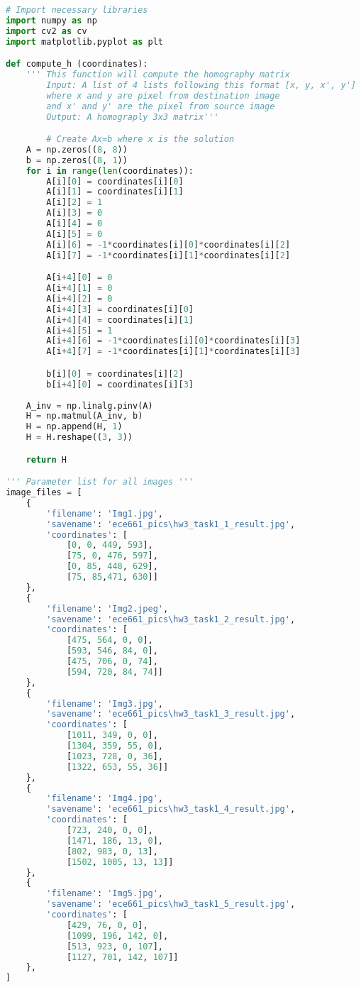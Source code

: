 \documentclass[11pt]{article}
\begin{document}
\begin{lstlisting}[language=Python, showstringspaces=false]
# Import necessary libraries
import numpy as np
import cv2 as cv
import matplotlib.pyplot as plt  

def compute_h (coordinates):
    ''' This function will compute the homography matrix
        Input: A list of 4 lists following this format [x, y, x', y']
        where x and y are pixel from destination image
        and x' and y' are the pixel from source image
        Output: A homograply 3x3 matrix'''

        # Create Ax=b where x is the solution
    A = np.zeros((8, 8))
    b = np.zeros((8, 1))
    for i in range(len(coordinates)):
        A[i][0] = coordinates[i][0]
        A[i][1] = coordinates[i][1]
        A[i][2] = 1
        A[i][3] = 0
        A[i][4] = 0
        A[i][5] = 0
        A[i][6] = -1*coordinates[i][0]*coordinates[i][2]
        A[i][7] = -1*coordinates[i][1]*coordinates[i][2]

        A[i+4][0] = 0
        A[i+4][1] = 0
        A[i+4][2] = 0
        A[i+4][3] = coordinates[i][0]
        A[i+4][4] = coordinates[i][1]
        A[i+4][5] = 1
        A[i+4][6] = -1*coordinates[i][0]*coordinates[i][3]
        A[i+4][7] = -1*coordinates[i][1]*coordinates[i][3]

        b[i][0] = coordinates[i][2]
        b[i+4][0] = coordinates[i][3]
    
    A_inv = np.linalg.pinv(A)
    H = np.matmul(A_inv, b)
    H = np.append(H, 1)
    H = H.reshape((3, 3))

    return H

''' Parameter list for all images '''
image_files = [
    {
        'filename': 'Img1.jpg',
        'savename': 'ece661_pics\hw3_task1_1_result.jpg',
        'coordinates': [
            [0, 0, 449, 593],
            [75, 0, 476, 597],
            [0, 85, 448, 629],
            [75, 85,471, 630]]
    },
    {
        'filename': 'Img2.jpeg',
        'savename': 'ece661_pics\hw3_task1_2_result.jpg',
        'coordinates': [
            [475, 564, 0, 0],
            [593, 546, 84, 0],
            [475, 706, 0, 74],
            [594, 720, 84, 74]]
    },
    {
        'filename': 'Img3.jpg',
        'savename': 'ece661_pics\hw3_task1_3_result.jpg',
        'coordinates': [
            [1011, 349, 0, 0],
            [1304, 359, 55, 0],
            [1023, 728, 0, 36],
            [1322, 653, 55, 36]]
    },
    {
        'filename': 'Img4.jpg',
        'savename': 'ece661_pics\hw3_task1_4_result.jpg',
        'coordinates': [
            [723, 240, 0, 0],
            [1471, 186, 13, 0],
            [802, 983, 0, 13],
            [1502, 1005, 13, 13]]
    },
    {
        'filename': 'Img5.jpg',
        'savename': 'ece661_pics\hw3_task1_5_result.jpg',
        'coordinates': [
            [429, 76, 0, 0],
            [1099, 196, 142, 0],
            [513, 923, 0, 107],
            [1127, 701, 142, 107]]
    },
]


\end{lstlisting}
\end{document}

